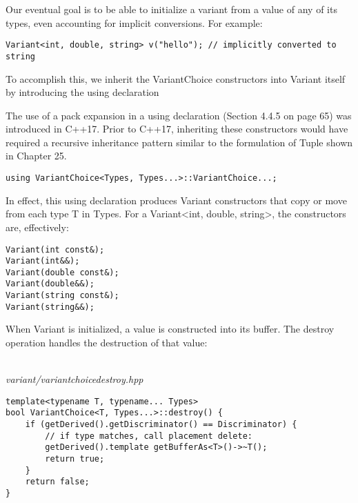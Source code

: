 Our eventual goal is to be able to initialize a variant from a value of any of its types, even accounting for implicit conversions. For example:

\begin{lstlisting}[style=styleCXX]
Variant<int, double, string> v("hello"); // implicitly converted to string
\end{lstlisting}

To accomplish this, we inherit the VariantChoice constructors into Variant itself by introducing the using declaration

\begin{tcolorbox}[colback=webgreen!5!white,colframe=webgreen!75!black]
\hspace*{0.75cm}The use of a pack expansion in a using declaration (Section 4.4.5 on page 65) was introduced in C++17. Prior to C++17, inheriting these constructors would have required a recursive inheritance pattern similar to the formulation of Tuple shown in Chapter 25.
\end{tcolorbox}

\begin{lstlisting}[style=styleCXX]
using VariantChoice<Types, Types...>::VariantChoice...;
\end{lstlisting}

In effect, this using declaration produces Variant constructors that copy or move from each type T in Types. For a Variant<int, double, string>, the constructors are, effectively:

\begin{lstlisting}[style=styleCXX]
Variant(int const&);
Variant(int&&);
Variant(double const&);
Variant(double&&);
Variant(string const&);
Variant(string&&);
\end{lstlisting}


When Variant is initialized, a value is constructed into its buffer. The destroy operation handles the destruction of that value:

\hspace*{\fill} \\ %
\noindent
\textit{variant/variantchoicedestroy.hpp}
\begin{lstlisting}[style=styleCXX]
template<typename T, typename... Types>
bool VariantChoice<T, Types...>::destroy() {
	if (getDerived().getDiscriminator() == Discriminator) {
		// if type matches, call placement delete:
		getDerived().template getBufferAs<T>()->~T();
		return true;
	}
	return false;
}
\end{lstlisting}


